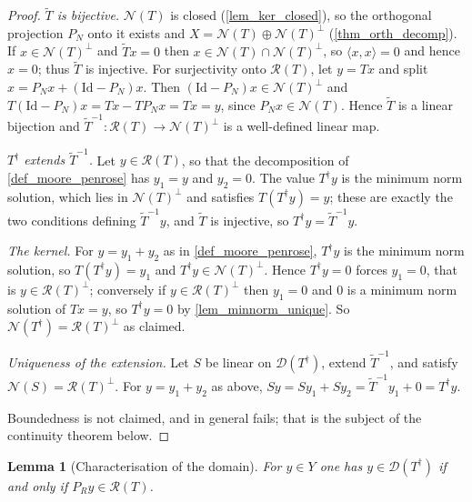 \documentclass[a4paper]{report}
\theoremstyle{plain}
\newtheorem{lemma}[theorem]{Lemma}
\theoremstyle{definition}
\theoremstyle{remark}
\newcommand{\Ran}{\mathcal{R}}
\newcommand{\Ker}{\mathcal{N}}
\newcommand{\Dom}{\mathcal{D}}
\newcommand{\Id}{\mathrm{Id}}
\newcommand{\dg}{^{\dagger}}
\begin{document}
\begin{proof}
  \emph{$\tilde{T}$ is bijective.}  $\Ker(T)$ is closed (\cref{lem_ker_closed}), so the
  orthogonal projection $P_N$ onto it exists and $X = \Ker(T) \oplus \Ker(T)^{\perp}$
  (\cref{thm_orth_decomp}).  If $x \in \Ker(T)^{\perp}$ and $\tilde{T}x = 0$ then
  $x \in \Ker(T) \cap \Ker(T)^{\perp}$, so $\langle x, x\rangle = 0$ and hence
  $x = 0$; thus $\tilde{T}$ is injective.  For surjectivity onto
  $\Ran(T)$, let $y = Tx$ and split $x = P_Nx + (\Id - P_N)x$.  Then
  $(\Id - P_N)x \in \Ker(T)^{\perp}$ and $T(\Id-P_N)x = Tx - TP_Nx = Tx = y$, since
  $P_Nx \in \Ker(T)$.  Hence $\tilde{T}$ is a linear bijection and $\tilde{T}^{-1} \colon
  \Ran(T) \to \Ker(T)^{\perp}$ is a well-defined linear map.

  \emph{$T\dg$ extends $\tilde{T}^{-1}$.}  Let $y \in \Ran(T)$, so that the decomposition
  of \cref{def_moore_penrose} has $y_1 = y$ and $y_2 = 0$.  The value $T\dg y$ is the
  minimum norm solution, which lies in $\Ker(T)^{\perp}$ and satisfies $T(T\dg y) = y$;
  these are exactly the two conditions defining $\tilde{T}^{-1}y$, and $\tilde{T}$ is
  injective, so $T\dg y = \tilde{T}^{-1}y$.

  \emph{The kernel.}  For $y = y_1 + y_2$ as in \cref{def_moore_penrose}, $T\dg y$ is the
  minimum norm solution, so $T(T\dg y) = y_1$ and $T\dg y \in \Ker(T)^{\perp}$.  Hence
  $T\dg y = 0$ forces $y_1 = 0$, that is $y \in \Ran(T)^{\perp}$; conversely if
  $y \in \Ran(T)^{\perp}$ then $y_1 = 0$ and $0$ is a minimum norm solution of $Tx = y$,
  so $T\dg y = 0$ by \cref{lem_minnorm_unique}.  So
  $\Ker(T\dg) = \Ran(T)^{\perp}$ as claimed.

  \emph{Uniqueness of the extension.}  Let $S$ be linear on $\Dom(T\dg)$, extend
  $\tilde{T}^{-1}$, and satisfy $\Ker(S) = \Ran(T)^{\perp}$.  For $y = y_1 + y_2$ as
  above, $Sy = Sy_1 + Sy_2 = \tilde{T}^{-1}y_1 + 0 = T\dg y$.

  Boundedness is not claimed, and in general fails; that is the subject of the
  continuity theorem below.
\end{proof}


\begin{lemma}[Characterisation of the domain]
  \label{lem_mp_domain}
  For $y \in Y$ one has $y \in \Dom(T\dg)$ if and only if $P_R y \in \Ran(T)$.
\end{lemma}
\end{document}

